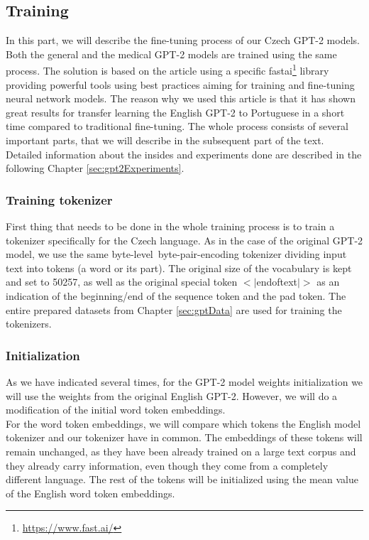\subsection{Training}
\label{sec:gpt2Training}
In this part, we will describe the fine-tuning process of our Czech GPT-2 models. Both the general and the medical GPT-2 models are trained using the same process. The solution is based on the \citet{guillou2020faster} article using a specific fastai\footnote[8]{\url{https://www.fast.ai/}} library providing powerful tools using best practices aiming for training and fine-tuning neural network models. The reason why we used this article is that it has shown great results for transfer learning the English GPT-2 to Portuguese in a short time compared to traditional fine-tuning. The whole process consists of several important parts, that we will describe in the subsequent part of the text. Detailed information about the insides and experiments done are described in the following Chapter \ref{sec:gpt2Experiments}.

\subsubsection*{Training tokenizer}
First thing that needs to be done in the whole training process is to train a tokenizer specifically for the Czech language. As in the case of the original GPT-2 model, we use the same byte-level~byte-pair-encoding\citep{sennrich2015neural} tokenizer dividing input text into tokens (a word or its part). The original size of the vocabulary is kept and set to 50257, as well as the original special token $<|$endoftext$|>$ as an indication of the beginning/end of the sequence token and the pad token. The entire prepared datasets from Chapter \ref{sec:gptData} are used for training the tokenizers.

\subsubsection*{Initialization}
As we have indicated several times, for the GPT-2 model weights initialization we will use the weights from the original English GPT-2. However, we will do a modification of the initial word token embeddings.\\

For the word token embeddings, we will compare which tokens the English model tokenizer and our tokenizer have in common. The embeddings of these tokens will remain unchanged, as they have been already trained on a large text corpus and they already carry information, even though they come from a completely different language. The rest of the tokens will be initialized using the mean value of the English word token embeddings.


